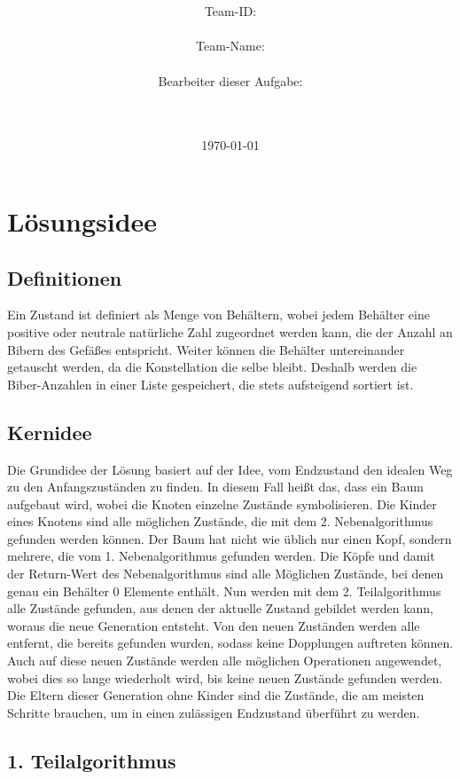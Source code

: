 \documentclass[a4paper,10pt,ngerman]{scrartcl}
\title{\textbf{\Huge\Aufgabe}}
\author{\LARGE Team-ID: \LARGE \TeamID \\\\
	    \LARGE Team-Name: \LARGE \TeamName \\\\
	    \LARGE Bearbeiter dieser Aufgabe: \\ 
	    \LARGE \Namen\\\\}
\date{\LARGE\today}
\begin{document}
\maketitle
\tableofcontents

\vspace{0.5cm}

\section{Lösungsidee}
\subsection{Definitionen}
Ein Zustand ist definiert als Menge von Behältern, wobei jedem Behälter eine positive oder neutrale natürliche Zahl zugeordnet werden kann, die der Anzahl an Bibern des Gefäßes entspricht. Weiter können die Behälter untereinander getauscht werden, da die Konstellation die selbe bleibt. Deshalb werden die Biber-Anzahlen in einer Liste gespeichert, die stets aufsteigend sortiert ist.
\subsection{Kernidee}
Die Grundidee der Lösung basiert auf der Idee, vom Endzustand den idealen Weg zu den Anfangszuständen zu finden. In diesem Fall heißt das, dass ein Baum  aufgebaut wird, wobei die Knoten einzelne Zustände symbolisieren. Die Kinder eines Knotens sind alle möglichen Zustände, die mit dem 2. Nebenalgorithmus gefunden werden können. Der Baum hat nicht wie üblich nur einen Kopf, sondern mehrere, die vom 1. Nebenalgorithmus gefunden werden. Die Köpfe und damit der Return-Wert des Nebenalgorithmus sind alle Möglichen Zustände, bei denen genau ein Behälter 0 Elemente enthält. Nun werden mit dem 2. Teilalgorithmus alle Zustände gefunden, aus denen der aktuelle Zustand gebildet werden kann, woraus die neue Generation entsteht. Von den neuen Zuständen werden alle entfernt, die bereits gefunden wurden, sodass keine Dopplungen auftreten können. Auch auf diese neuen Zustände werden alle möglichen Operationen angewendet, wobei dies so lange wiederholt wird, bis keine neuen Zustände gefunden werden. Die Eltern dieser Generation ohne Kinder sind die Zustände, die am meisten Schritte brauchen, um in einen zulässigen Endzustand überführt zu werden.
\subsection{1. Teilalgorithmus}
\end{document}
